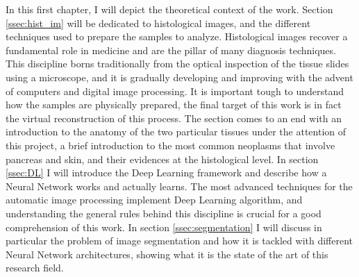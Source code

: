 In this first chapter, I will depict the theoretical context of the work. Section \ref{ssec:hist_im} will be dedicated to histological images, and the different techniques used to prepare the samples to analyze. Histological images recover a fundamental role in medicine and are the pillar of many diagnosis techniques. This discipline borns traditionally from the optical inspection of the tissue slides using a microscope, and it is gradually developing and improving with the advent of computers and digital image processing. It is important tough to understand how the samples are physically prepared, the final target of this work is in fact the virtual reconstruction of this process. The section comes to an end with an introduction to the anatomy of the two particular tissues under the attention of this project, a brief introduction to the most common neoplasms that involve pancreas and skin, and their evidences at the histological level. In section \ref{ssec:DL} I will introduce the Deep Learning framework and describe how a Neural Network works and actually learns. The most advanced techniques for the automatic image processing implement Deep Learning algorithm, and understanding the general rules behind this discipline is crucial for a good comprehension of this work. In section \ref{ssec:segmentation} I will discuss in particular the problem of image segmentation and how it is tackled with different Neural Network architectures, showing what it is the state of the art of this research field.
